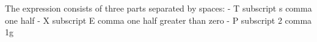 The expression consists of three parts separated by spaces:
- T subscript s comma one half
- X subscript E comma one half greater than zero
- P subscript 2 comma 1g